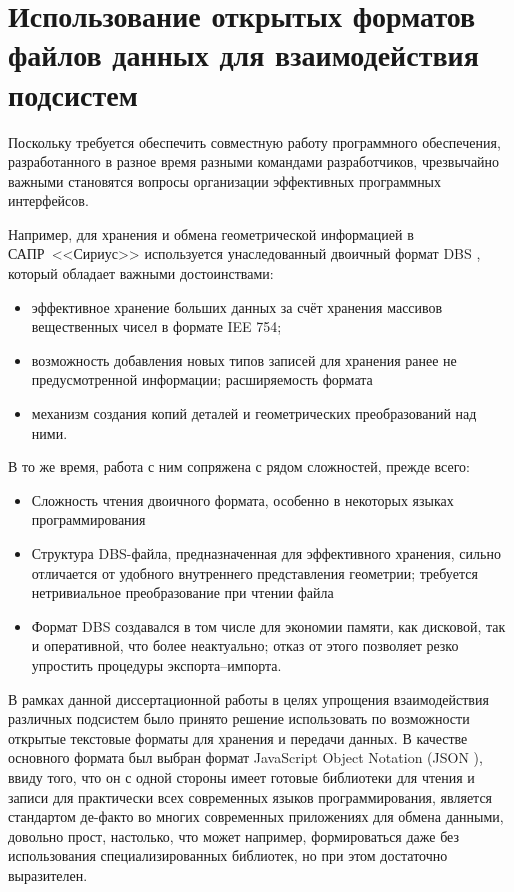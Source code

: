
\section{
  Использование открытых форматов файлов данных для взаимодействия подсистем
}
\label{ch:json.files}

Поскольку требуется обеспечить
совместную работу программного обеспечения,
разработанного в разное время разными командами разработчиков,
чрезвычайно важными становятся вопросы
организации эффективных программных интерфейсов.

Например, для хранения и обмена геометрической информацией
в САПР~<<Сириус>>
используется унаследованный двоичный формат DBS
\cite{bi:DBS},
который обладает важными достоинствами:
\begin{itemize}
  \item
  эффективное хранение больших данных за счёт хранения массивов вещественных чисел в формате IEE 754;
  \item
  возможность добавления новых типов записей для хранения ранее не предусмотренной информации;
  расширяемость формата
  \item
  механизм создания копий деталей и геометрических преобразований над ними.
\end{itemize}

В то же время,
работа с ним сопряжена с рядом сложностей,
прежде всего:
\begin{itemize}
  \item
  Сложность чтения двоичного формата,
  особенно в некоторых языках программирования
  \item
  Структура DBS-файла,
  предназначенная для эффективного хранения,
  сильно отличается от удобного внутреннего представления
  геометрии;
  требуется нетривиальное преобразование при чтении файла
  \item
  Формат DBS создавался в том числе для экономии памяти,
  как дисковой, так и оперативной,
  что более неактуально;
  отказ от этого позволяет резко упростить процедуры экспорта--импорта.
\end{itemize}

В рамках данной диссертационной работы
в целях упрощения взаимодействия различных подсистем
было принято решение использовать по возможности
открытые текстовые форматы для хранения и передачи данных.
В качестве основного формата был выбран формат
JavaScript Object Notation
(JSON
\cite{bi:JSON}),
ввиду того, что
он с одной стороны имеет готовые библиотеки для чтения и записи
для практически всех современных языков
программирования,
является стандартом де-факто во многих
современных приложениях для обмена данными,
довольно прост,
настолько, что может например,
формироваться даже без использования специализированных библиотек,
но при этом достаточно выразителен.

